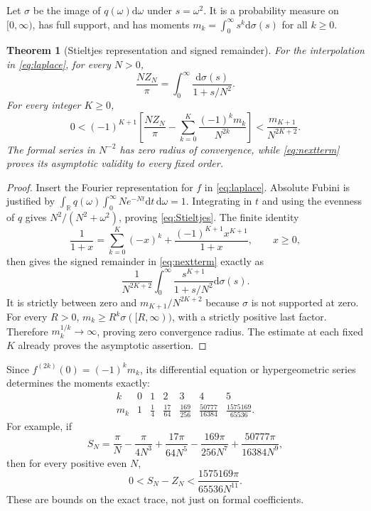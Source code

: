 \documentclass[10pt]{article}
\newtheorem{theorem}{Theorem}
\newcommand{\dd}{\mathrm d}
\begin{document}
Let $\sigma$ be the image of $q(\omega)\dd\omega$ under $s=\omega^2$.
It is a probability measure on $[0,\infty)$, has full support, and has
moments $m_k=\int_0^\infty s^k\dd\sigma(s)$ for all $k\ge0$.
\begin{theorem}[Stieltjes representation and signed remainder]
For the interpolation in \eqref{eq:laplace}, for every $N>0$,
\begin{equation}
\boxed{\quad\frac{NZ_N}\pi=\int_0^\infty
\frac{\dd\sigma(s)}{1+s/N^2}.\quad}\label{eq:Stieltjes}
\end{equation}
For every integer $K\ge0$,
\begin{equation}
0<(-1)^{K+1}\left[\frac{NZ_N}\pi-
\sum_{k=0}^{K}\frac{(-1)^km_k}{N^{2k}}\right]
<\frac{m_{K+1}}{N^{2K+2}}.\label{eq:nextterm}
\end{equation}
The formal series in $N^{-2}$ has zero radius of convergence, while
\eqref{eq:nextterm} proves its asymptotic validity to every fixed order.
\end{theorem}
\begin{proof}
Insert the Fourier representation for $f$ in \eqref{eq:laplace}.
Absolute Fubini is justified by
$\int_{\mathbb R}q(\omega)\int_0^\infty Ne^{-Nt}\dd t\,\dd\omega=1$.
Integrating in $t$ and using the evenness of $q$ gives
$N^2/(N^2+\omega^2)$, proving \eqref{eq:Stieltjes}. The finite identity
\[
\frac1{1+x}=\sum_{k=0}^{K}(-x)^k+
\frac{(-1)^{K+1}x^{K+1}}{1+x},\qquad x\ge0,
\]
then gives the signed remainder in \eqref{eq:nextterm} exactly as
\[
\frac1{N^{2K+2}}\int_0^\infty
\frac{s^{K+1}}{1+s/N^2}\dd\sigma(s).
\]
It is strictly between zero and $m_{K+1}/N^{2K+2}$ because $\sigma$ is
not supported at zero. For every $R>0$,
$m_k\ge R^k\sigma([R,\infty))$, with a strictly positive last factor.
Therefore $m_k^{1/k}\to\infty$, proving zero convergence radius.
The estimate at each fixed $K$ already proves the asymptotic assertion.
\end{proof}

Since $f^{(2k)}(0)=(-1)^km_k$, its differential equation or
hypergeometric series determines the moments exactly:
\begin{equation}
\begin{array}{c|rrrrrr}
k&0&1&2&3&4&5\\\hline
m_k&1&\frac14&\frac{17}{64}&\frac{169}{256}&
\frac{50777}{16384}&\frac{1575169}{65536}.
\end{array}\label{eq:moments}
\end{equation}
For example, if
\[
S_N=\frac\pi N-\frac\pi{4N^3}+\frac{17\pi}{64N^5}
-\frac{169\pi}{256N^7}+\frac{50777\pi}{16384N^9},
\]
then for every positive even $N$,
\begin{equation}
0<S_N-Z_N<\frac{1575169\pi}{65536N^{11}}.\label{eq:concrete}
\end{equation}
These are bounds on the exact trace, not just on formal coefficients.
\end{document}

